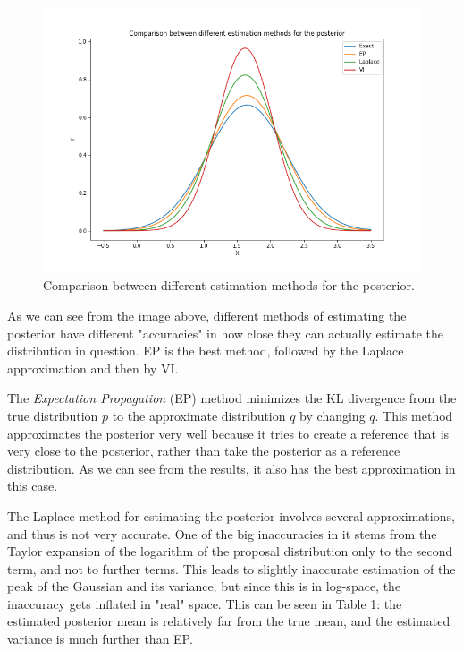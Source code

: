 \documentclass[11pt]{article}
\begin{document}
\begin{enumerate}[label=\textbf{\alph*.}]
        \begin{figure}[H]
            \centering
            \includegraphics[scale=0.45]{midterm_posterior_estimation.png}
            \caption{Comparison between different estimation methods for the posterior.}
        \end{figure}

        As we can see from the image above, different methods of estimating the posterior have different "accuracies" in how close they can actually estimate the distribution in question. EP is the best method, followed by the Laplace approximation and then by VI.

        The \textit{Expectation Propagation} (EP) method minimizes the KL divergence from the true distribution $p$ to the approximate distribution $q$ by changing $q$. This method approximates the posterior very well because it tries to create a reference that is very close to the posterior, rather than take the posterior as a reference distribution. As we can see from the results, it also has the best approximation in this case.

        The Laplace method for estimating the posterior involves several approximations, and thus is not very accurate. One of the big inaccuracies in it stems from the Taylor expansion of the logarithm of the proposal distribution only to the second term, and not to further terms. This leads to slightly inaccurate estimation of the peak of the Gaussian and its variance, but since this is in log-space, the inaccuracy gets inflated in "real" space. This can be seen in Table 1: the estimated posterior mean is relatively far from the true mean, and the estimated variance is much further than EP.


\end{enumerate}
\end{document}
